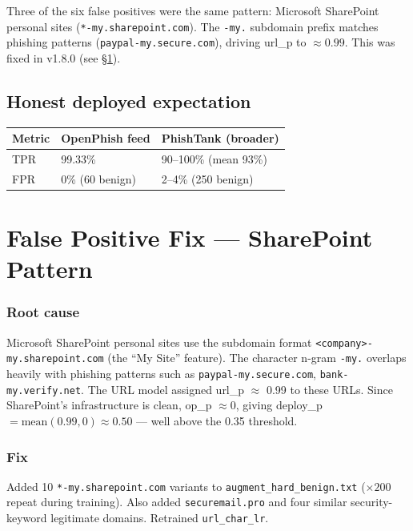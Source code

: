 \documentclass[11pt,a4paper]{article}
\newcommand{\code}[1]{\texttt{#1}}
\begin{document}
Three of the six false positives were the same pattern:
Microsoft SharePoint personal sites (\code{*-my.sharepoint.com}).
The \code{-my.} subdomain prefix matches phishing patterns
(\code{paypal-my.secure.com}), driving url\_p to $\approx 0.99$.
This was fixed in v1.8.0 (see \S\ref{sec:fpfix}).

\subsection*{Honest deployed expectation}

\begin{center}
\renewcommand{\arraystretch}{1.3}
\begin{tabular}{lll}
\toprule
Metric & OpenPhish feed & PhishTank (broader) \\
\midrule
TPR & 99.33\% & 90--100\% (mean 93\%) \\
FPR & 0\% (60 benign) & 2--4\% (250 benign) \\
\bottomrule
\end{tabular}
\end{center}

\section{False Positive Fix --- SharePoint Pattern}
\label{sec:fpfix}

\subsubsection*{Root cause}

Microsoft SharePoint personal sites use the subdomain format
\code{<company>-my.sharepoint.com} (the ``My Site'' feature).
The character n-gram \texttt{-my.} overlaps heavily with phishing
patterns such as \code{paypal-my.secure.com},
\code{bank-my.verify.net}. The URL model assigned url\_p $\approx$
0.99 to these URLs. Since SharePoint's infrastructure is clean,
op\_p $\approx 0$, giving deploy\_p $= \text{mean}(0.99, 0) \approx
0.50$ --- well above the 0.35 threshold.

\subsubsection*{Fix}

Added 10 \code{*-my.sharepoint.com} variants to
\code{augment\_hard\_benign.txt} ($\times 200$ repeat during
training). Also added \code{securemail.pro} and four similar
security-keyword legitimate domains. Retrained \code{url\_char\_lr}.
\end{document}

